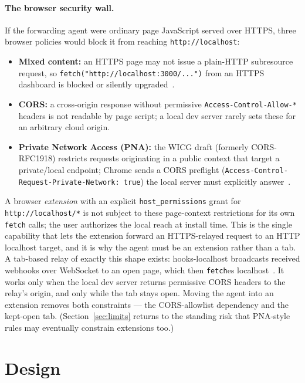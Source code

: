 \documentclass[11pt]{article}
\begin{document}
\paragraph{The browser security wall.} If the forwarding agent were ordinary
page JavaScript served over HTTPS, three browser policies would block it from
reaching \texttt{http://localhost}:
\begin{itemize}
  \item \textbf{Mixed content:} an HTTPS page may not issue a plain-HTTP
        subresource request, so \texttt{fetch("http://localhost:3000/...")}
        from an HTTPS dashboard is blocked or silently upgraded~\cite{mdnmixedcontent}.
  \item \textbf{CORS:} a cross-origin response without permissive
        \texttt{Access-Control-Allow-*} headers is not readable by page script;
        a local dev server rarely sets these for an arbitrary cloud origin.
  \item \textbf{Private Network Access (PNA):} the WICG draft (formerly
        CORS-RFC1918) restricts requests originating in a public context that
        target a private/local endpoint; Chrome sends a CORS preflight
        (\texttt{Access-Control-Request-Private-Network: true}) the local
        server must explicitly answer~\cite{pna,pnapreflight}.
\end{itemize}
A browser \emph{extension} with an explicit \texttt{host\_permissions} grant
for \texttt{http://localhost/*} is not subject to these page-context
restrictions for its own \texttt{fetch} calls; the user authorizes the local
reach at install time. This is the single capability that lets the extension
forward an HTTPS-relayed request to an HTTP localhost target, and it is why the
agent must be an extension rather than a tab. A tab-based relay of exactly this
shape exists: hooks-localhost broadcasts received webhooks over WebSocket to an
open page, which then \texttt{fetch}es localhost~\cite{hookslocalhost}. It works
only when the local dev server returns permissive CORS headers to the relay's
origin, and only while the tab stays open. Moving the agent into an extension
removes both constraints --- the CORS-allowlist dependency and the kept-open
tab. (Section~\ref{sec:limits} returns to the standing risk that PNA-style rules
may eventually constrain extensions too.)

\section{Design}
\label{sec:design}
\end{document}
